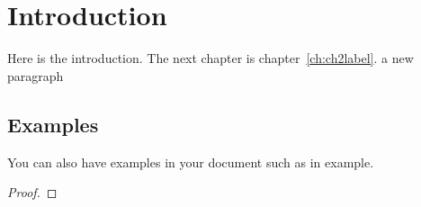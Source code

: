 \chapter{Introduction}\label{ch:introduction}
Here is the introduction. The next chapter is chapter~\ref{ch:ch2label}.
a new paragraph

\section{Examples}
You can also have examples in your document such as in example.

\begin{example}
\blindtext[1]
\end{example}

\begin{theorem}
\blindtext[1]
\end{theorem}

\begin{proof}
\blindtext[1]
\end{proof}